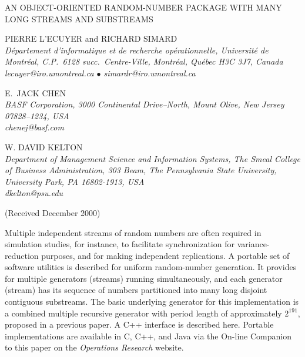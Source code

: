 \documentclass[12pt]{article}
\begin{document}
\begin{center}
{\Large\sfbold AN OBJECT-ORIENTED RANDOM-NUMBER PACKAGE
 WITH MANY LONG STREAMS AND SUBSTREAMS}

\bigskip

{\sfbold PIERRE L'ECUYER and RICHARD SIMARD}\\
{\small\it D\'{e}partement d'informatique et de recherche
op\'{e}rationnelle, Universit\'{e} de Montr\'{e}al, C.P.\
6128 succ.\ Centre-Ville, Montr\'{e}al, Qu\'{e}bec H3C 3J7,
Canada\\ lecuyer@iro.umontreal.ca $\bullet$ simardr@iro.umontreal.ca}

\bigskip

{\sfbold E.\ JACK CHEN}\\
{\small\it BASF Corporation, 3000 Continental Drive--North,
Mount Olive, New Jersey 07828--1234, USA\\ chenej@basf.com}

\bigskip

{\sfbold W. DAVID KELTON}\\
{\small\it Department of Management Science and Information Systems,
The Smeal College of Business Administration, 303 Beam,
The Pennsylvania State University, University Park, PA 16802-1913, USA \\
dkelton@psu.edu}

\bigskip

(Received December 2000)

\end{center}

\medskip

\noindent
Multiple independent streams of random numbers are often required
in simulation studies, for instance, to facilitate synchronization
for variance-reduction purposes, and for making independent
replications.  A portable set of software utilities is described
for uniform random-number generation. It provides for multiple
generators (streams) running simultaneously, and each generator
(stream) has its sequence of numbers partitioned into many long
disjoint contiguous substreams.
The basic underlying generator for this implementation is a combined
multiple recursive generator with period length of
approximately $2^{191}$, proposed in a previous paper.
A C++ interface is described here. Portable implementations are
available in C, C++, and Java via the On-line Companion to this %
paper on the {\it Operations Research\/} website. %
\end{document}

